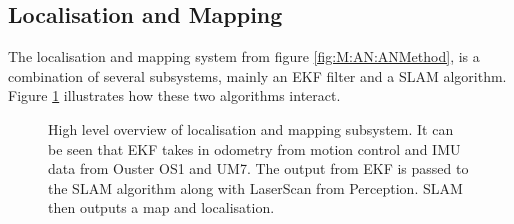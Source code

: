 
% 




\subsection{Localisation and Mapping} \label{sec:M:AN:LocalisationAndMapping}
The localisation and mapping system from figure \ref{fig:M:AN:ANMethod}, is a combination of several subsystems, mainly an EKF filter and a SLAM algorithm. Figure \ref{fig:M:AN:LAM:LocMapping} illustrates how these two algorithms interact.

\begin{figure}[htp]
    \fontsize{7}{14}\selectfont
    \centering
    
    \caption{High level overview of localisation and mapping subsystem. It can be seen that EKF takes in odometry from motion control and IMU data from Ouster OS1 and UM7. The output from EKF is passed to the SLAM algorithm along with LaserScan from Perception. SLAM then outputs a map and localisation.}
    \label{fig:M:AN:LAM:LocMapping}
\end{figure}

